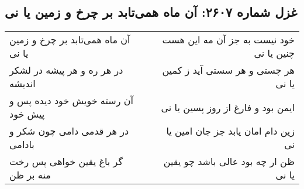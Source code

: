\begin{center}
\section*{غزل شماره ۲۶۰۷: آن ماه همی‌تابد بر چرخ و زمین یا نی}
\label{sec:2607}
\begin{longtable}{l p{0.5cm} r}
آن ماه همی‌تابد بر چرخ و زمین یا نی
&&
خود نیست به جز آن مه این هست چنین یا نی
\\
در هر ره و هر پیشه در لشکر اندیشه
&&
هر چستی و هر سستی آید ز کمین یا نی
\\
آن رسته خویش خود دیده پس و پیش خود
&&
ایمن بود و فارغ از روز پسین یا نی
\\
در هر قدمی دامی چون شکر و بادامی
&&
زین دام امان یابد جز جان امین یا نی
\\
گر باغ یقین خواهی پس رخت منه بر ظن
&&
ظن ار چه بود عالی باشد چو یقین یا نی
\\
\end{longtable}
\end{center}
